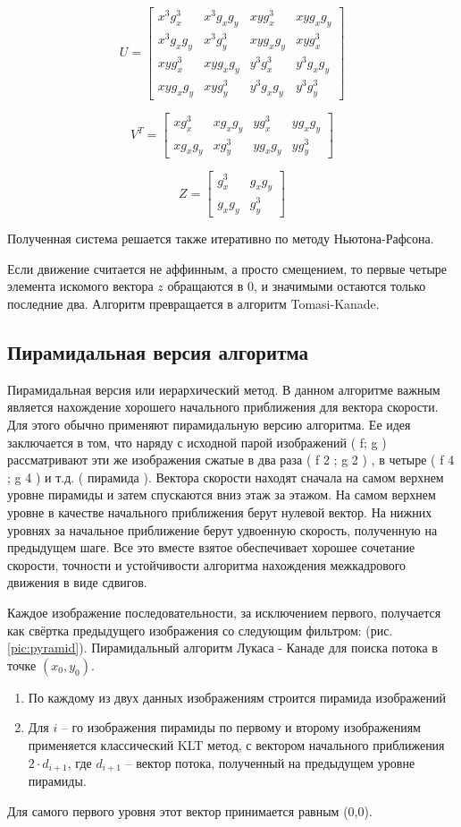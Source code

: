 $$U=\begin{bmatrix}
x^3 g^3_x & x^3 g_x g_y & x y g^3_x & x y g_x g_y \\
x^3g_xg_y & x^3g^3_y & xyg_xg_y & xyg^3_x \\
xyg^3_x & xyg_xg_y & y^3g^3_x & y^3g_xg_y \\
xyg_xg_y & xyg^3_y & y^3g_xg_y & y^3g^3_y
\end{bmatrix}$$

$$V^T=\begin{bmatrix}
xg^3_x & xg_xg_y & yg^3_x & yg_xg_y \\
xg_xg_y & xg^3_y & yg_xg_y & yg^3_y
\end{bmatrix}$$

$$Z=\begin{bmatrix}
g^3_x & g_xg_y \\
g_xg_y & g^3_y
\end{bmatrix}$$

Полученная система решается также итеративно по методу Ньютона-Рафсона.

Если движение считается не аффинным, а просто смещением, то первые четыре элемента искомого вектора $z$ обращаются в 0, и значимыми остаются только последние два. Алгоритм превращается в алгоритм Tomasi-Kanade.
\subsection{Пирамидальная версия алгоритма}

Пирамидальная версия или иерархический метод. В данном алгоритме важным является нахождение хорошего начального приближения для вектора скорости. Для этого обычно применяют пирамидальную версию алгоритма. Ее идея заключается в том, что наряду с исходной парой изображений ( f; g ) рассматривают эти же изображения сжатые в два раза ( f 2 ; g 2 ) , в четыре ( f 4 ; g 4 ) и  т.д.  ( пирамида ).  Вектора  скорости находят  сначала  на  самом  верхнем  уровне  пирамиды и затем спускаются вниз этаж за этажом. На самом верхнем уровне в качестве начального приближения берут нулевой вектор. На нижних уровнях за начальное приближение берут удвоенную скорость, полученную на предыдущем шаге. Все это вместе взятое обеспечивает хорошее сочетание скорости, точности и устойчивости алгоритма  нахождения  межкадрового  движения  в  виде сдвигов.

Каждое изображение последовательности, за исключением первого, получается как свёртка предыдущего изображения со следующим фильтром:
(рис. \ref{pic:pyramid}).
Пирамидальный алгоритм Лукаса - Канаде для поиска потока в точке $(x_0,y_0)$.
\begin{enumerate}
\item По каждому из двух данных изображениям строится пирамида изображений
\item Для $i$ – го изображения пирамиды по первому и второму изображениям применяется классический KLT метод, с вектором начального приближения $2 \cdot d_{i+1}$, где $d_{i+1}$ – вектор потока, полученный на предыдущем уровне пирамиды.
\end{enumerate}
Для самого первого уровня этот вектор принимается равным (0,0).

